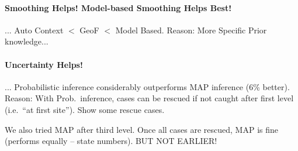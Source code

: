 \documentclass[10pt,twocolumn,letterpaper]{article}
\begin{document}
\paragraph{Smoothing Helps! Model-based Smoothing Helps Best!}
... Auto Context $<$ GeoF $<$ Model Based. Reason: More Specific Prior knowledge...

\paragraph{Uncertainty Helps!}
... Probabilistic inference considerably outperforms MAP inference (6\% better). Reason: With Prob.\ inference, cases can be rescued if not caught after first level (i.e.\ "`at first site"'). Show some rescue cases. 

We also tried MAP after third level. Once all cases are rescued, MAP is fine (performs equally -- state numbers). BUT NOT EARLIER!



{\small


}
\end{document}
